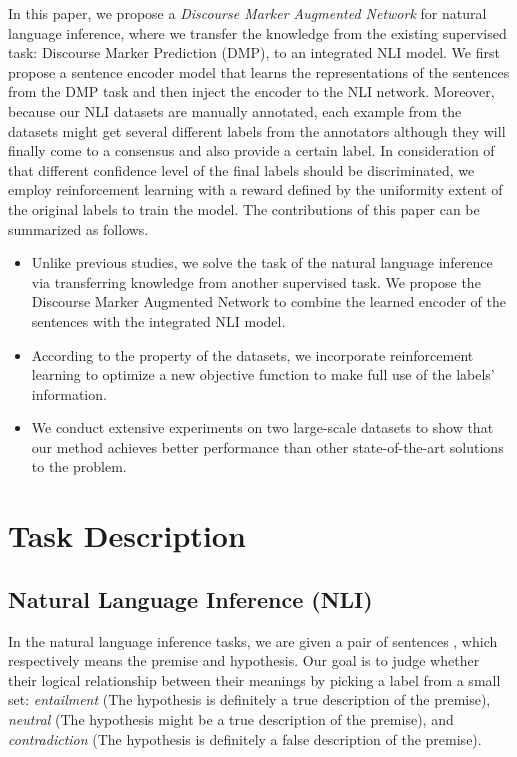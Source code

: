 \documentclass[11pt,letterpaper]{article}
\begin{document}
In this paper, we propose a \emph{Discourse Marker Augmented Network} for natural language inference, where we transfer the knowledge from the existing supervised task: Discourse Marker Prediction (DMP)\cite{nie2017dissent}, to an integrated NLI model. We first propose a sentence encoder model that learns the representations of the sentences from the DMP task and then inject the encoder to the NLI network. Moreover, because our NLI datasets are manually annotated, each example from the datasets might get several different labels from the annotators although they will finally come to a consensus and also provide a certain label. In consideration of that different confidence level of the final labels should be discriminated, we employ reinforcement learning with a reward defined by the uniformity extent of the original labels to train the model. The contributions of this paper can be summarized as follows.
\begin{itemize}
	\item Unlike previous studies, we solve the task of the natural language inference via transferring knowledge from another supervised task. We propose the Discourse Marker Augmented Network to combine the learned encoder of the sentences with the integrated NLI model.
	
	\item According to the property of the datasets, we incorporate reinforcement learning to optimize a new objective function to make full use of the labels' information.
	
	\item We conduct extensive experiments on two large-scale datasets to show that our method achieves better performance than other state-of-the-art solutions to the problem.
\end{itemize}


\section{Task Description}
\subsection{Natural Language Inference (NLI)}
In the natural language inference tasks, we are given a pair of sentences , which respectively means the premise and hypothesis. Our goal is to judge whether their logical relationship between their meanings by picking a label from a small set: \emph{entailment} (The hypothesis is definitely a true description of the premise), \emph{neutral} (The hypothesis might be a true description of the premise), and \emph{contradiction} (The hypothesis is definitely a false description of the premise).
\end{document}

